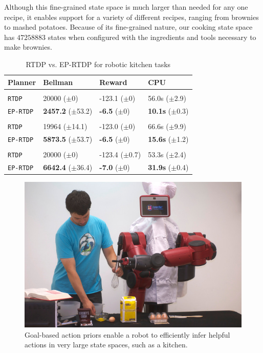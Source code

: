 \documentclass[letterpaper]{article}
\newcommand{\ra}[1]{\renewcommand{\arraystretch}{#1}} %
\begin{document}
Although this fine-grained state space is much larger than needed for
any one recipe, it enables support for a variety of different recipes,
ranging from brownies to mashed potatoes.  Because of its
fine-grained nature, our cooking state space has
$\num[round-precision=3, round-mode=figures]{47258883}$ states when
configured with the ingredients and tools necessary to make brownies.

\begin{table}[t]
\ra{1.1}
\small
\begin{tabular}{@{}llll@{}}\toprule
Planner & Bellman & Reward & CPU \\ \midrule
&\hspace{-10mm}{\it Dry Ingredients} \\
\texttt{RTDP} 	& 20000 ($\pm$0) 			& {-123.1} ($\pm$0)  & {56.0s}   ($\pm$2.9) \\
\texttt{EP-RTDP} 	& {\bf 2457.2} ($\pm$53.2) 		& {\bf -6.5}   ($\pm$0) & {\bf 10.1s}   ($\pm$0.3) \\  \hline
&\hspace{-10mm}{\it Wet Ingredients} \\
\texttt{RTDP} 	& 19964 ($\pm$14.1) 			& { -123.0}   ($\pm$0) & 66.6s   ($\pm$9.9) \\
\texttt{EP-RTDP} 	& {\bf 5873.5} ($\pm$53.7) 		& {\bf -6.5}   ($\pm$0) & {\bf 15.6s}   ($\pm$1.2) \\ \hline
&\hspace{-10mm}{\it Brownie Batter} \\
\texttt{RTDP} 	& 20000 ($\pm$0) 			& -123.4   ($\pm$0.7) & { 53.3s}   ($\pm$2.4) \\
\texttt{EP-RTDP} 	& {\bf 6642.4} ($\pm$36.4) 		& {\bf -7.0}   ($\pm$0) & {\bf 31.9s}   ($\pm$0.4) \\ 
\bottomrule
\end{tabular}
\caption{RTDP vs. EP-RTDP for robotic kitchen tasks}
\label{table:baxter_results}
\end{table}

\begin{figure}[b]
\centering
\includegraphics[width=0.75\linewidth]{figures/baxter_scaled.jpg}%
  \caption{Goal-based action priors enable a robot to efficiently infer helpful actions in
    very large state spaces, such as a kitchen.}
  \label{fig:baxter_results}
\end{figure}
\end{document}
